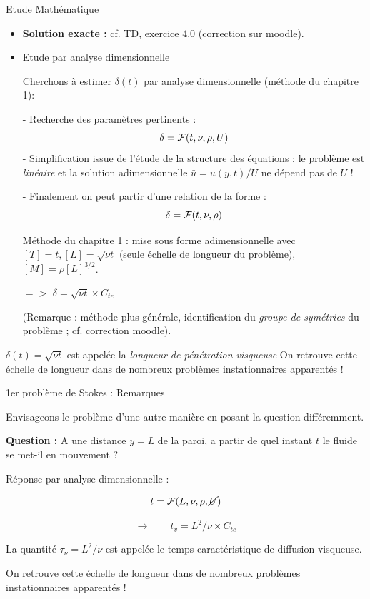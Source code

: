 \begin{frame}{Etude Mathématique}
\small

\begin{itemize}
\item {\bf Solution exacte :}  cf. TD, exercice 4.0 (correction sur moodle).

\item Etude par analyse dimensionnelle

Cherchons à estimer $\delta(t)$ par analyse dimensionnelle (méthode du chapitre 1):

- Recherche des paramètres pertinents : 
$$
\delta = {\cal F} ( t, \nu, \rho, U) 
$$
- Simplification issue de l'étude de la structure des équations : le problème est {\em linéaire} et la solution adimensionnelle $\bar{u} = u(y,t)/U$ ne dépend pas 
de $U$ !

- Finalement on peut partir d'une relation de la forme :
$$
\delta = {\cal F} ( t, \nu, \rho) 
$$


Méthode du chapitre 1 : mise sous forme adimensionnelle avec $[T] = t, [L]  = \sqrt{\nu t}$ (seule échelle de longueur du problème), $[M] = \rho [L]^{3/2}$.


$=>$ $\delta = \sqrt{\nu t} \times C_{te}$
 

(Remarque : méthode plus générale, identification du {\em groupe de symétries} du problème ; cf. correction moodle).
\end{itemize}

$\delta(t) = \sqrt{\nu t}$ est appelée la {\em longueur de pénétration visqueuse} On retrouve cette échelle de longueur dans de nombreux problèmes instationnaires apparentés !

\end{frame}


\begin{frame}{1er problème de Stokes : Remarques}

\small
\bigskip
Envisageons le problème d'une autre manière en posant la question différemment.

\pause
\medskip

{\bf Question :} A une distance $y=L$ de la paroi, a partir de quel instant $t$ le fluide se met-il en mouvement ?
\pause
\medskip

Réponse par analyse dimensionnelle :
 
$$t = {\cal F} ( L,\nu,\rho, \cancel{U} )$$  

$$\rightarrow \qquad t_v = L^2/\nu \times C_{te}$$

\pause
\medskip

La quantité $\tau_\nu = L^2/ \nu $ est appelée le temps caractéristique de diffusion visqueuse. 

On retrouve cette échelle de longueur dans de nombreux problèmes instationnaires apparentés !



\end{frame}


